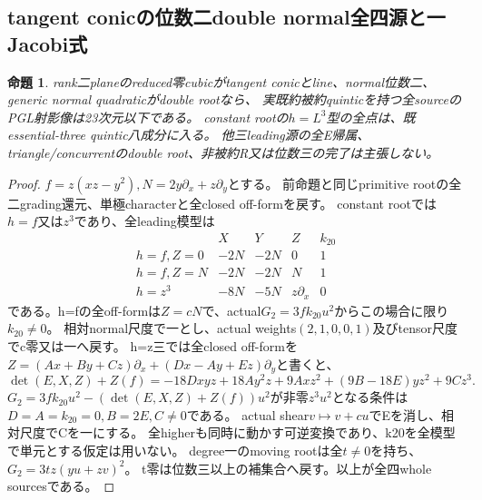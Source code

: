 \documentclass[a4paper,11pt]{ltjsarticle}
\newtheorem{proposition}{命題}[section]
\theoremstyle{definition}
\begin{document}
\subsection{tangent conicの位数二double normal全四源と一Jacobi式}
\begin{proposition}\label{prop:plane-m2-double-tangent-all-G}
rank二planeのreduced零cubicがtangent conicとline、normal位数二、generic normal quadraticがdouble rootなら、
実既約被約quinticを持つ全sourceのPGL射影像は23次元以下である。
constant rootの$h=L^3$型の全点は、既essential-three quintic八成分に入る。
他三leading源の全E帰属、triangle/concurrentのdouble root、非被約R又は位数三の完了は主張しない。
\end{proposition}
\begin{proof}
$f=z(xz-y^2),N=2y\partial_x+z\partial_y$とする。
前命題と同じprimitive rootの全二grading還元、単極characterと全closed off-formを戻す。
constant rootでは$h=f$又は$z^3$であり、全leading模型は
\[
\begin{array}{c|c|c|c|c}
 &X&Y&Z&k_{20}\\\hline
 h=f,Z=0&-2N&-2N&0&1\\
 h=f,Z=N&-2N&-2N&N&1\\
 h=z^3&-8N&-5N&z\partial_x&0
\end{array}
\]
である。h=fの全off-formは$Z=cN$で、actual$G_2=3fk_{20}u^2$からこの場合に限り$k_{20}\ne0$。
相対normal尺度で一とし、actual weights$(2,1,0,0,1)$及びtensor尺度でc零又は一へ戻す。
h=z三では全closed off-formを
$Z=(Ax+By+Cz)\partial_x+(Dx-Ay+Ez)\partial_y$と書くと、
\[
 \det(E,X,Z)+Z(f)=-18Dxyz+18Ay^2z+9Axz^2+(9B-18E)yz^2+9Cz^3.
\]
$G_2=3fk_{20}u^2-(\det(E,X,Z)+Z(f))u^2$が非零$z^3u^2$となる条件は
$D=A=k_{20}=0,B=2E,C\ne0$である。
actual shear$v\mapsto v+cu$でEを消し、相対尺度でCを一にする。
全higherも同時に動かす可逆変換であり、k20を全模型で単元とする仮定は用いない。
degree一のmoving rootは全$t\ne0$を持ち、$G_2=3tz(yu+zv)^2$。
t零は位数三以上の補集合へ戻す。以上が全四whole sourcesである。


\end{proof}
\end{document}

